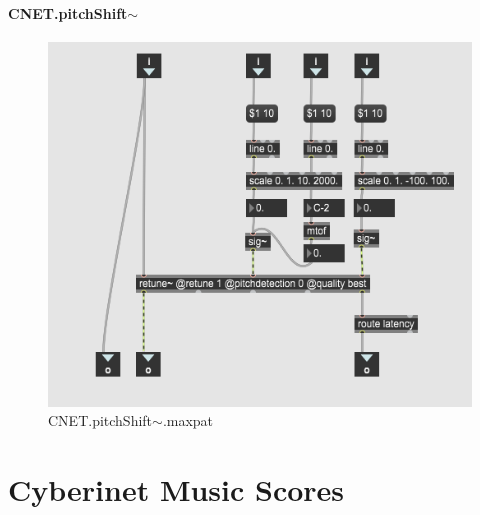 \subsubsection{CNET.pitchShift$\sim$}

\begin{figure}
    \centering
    \includegraphics{diagrams/maxPatches/CNET.pitchShift~.png}
    \caption{CNET.pitchShift$\sim$.maxpat}
    \label{fig:pitchshift}
\end{figure}

\chapter{Cyberinet Music Scores}
